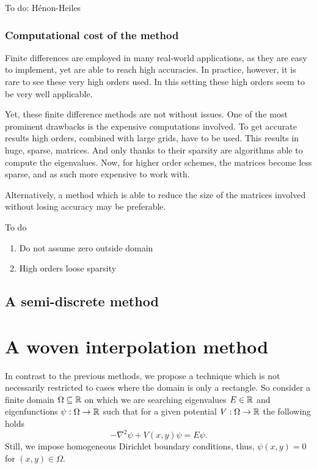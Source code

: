     {\color{red}To do: Hénon-Heiles}


\subsubsection{Computational cost of the method}

Finite differences are employed in many real-world applications, as they are easy to implement, yet are able to reach high accuracies. In practice, however, it is rare to see these very high orders used. In this setting these high orders seem to be very well applicable.

Yet, these finite difference methods are not without issues. One of the most prominent drawbacks is the expensive computations involved. To get accurate results high orders, combined with large grids, have to be used. This results in huge, sparse, matrices. And only thanks to their sparsity are algorithms able to compute the eigenvalues. Now, for higher order schemes, the matrices become less sparse, and as such more expensive to work with.

Alternatively, a method which is able to reduce the size of the matrices involved without losing accuracy may be preferable.

    {\color{red}To do

        \begin{enumerate}
            \item Do not assume zero outside domain
            \item High orders loose sparsity
        \end{enumerate}

    }

\subsection{A semi-discrete method}\label{sec:c4_semi_discrete}

\section{A woven interpolation method}

In contrast to the previous methods, we propose a technique which is not necessarily restricted to cases where the domain is only a rectangle. So consider a finite domain $\Omega \subseteq \mathbb{R}$ on which we are searching eigenvalues $E \in \mathbb{R}$ and eigenfunctions $\psi: \Omega \to \mathbb{R}$ such that for a given potential $V : \Omega \to \mathbb{R}$ the following holds
\begin{equation}\label{equ:c4_schrodinger_equation_new_method}
    -\nabla^2 \psi + V(x, y) \psi = E \psi\text{.}
\end{equation}
Still, we impose homogeneous Dirichlet boundary conditions, thus, $\psi(x, y) = 0$ for $(x, y) \in \Omega$.


